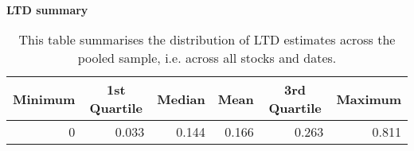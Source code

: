 \begin{table}[h]
\caption{\\ \large{\textbf{LTD summary}}}
\captionsetup{font = footnotesize, justification = justified, width = \linewidth}
\caption*{This table summarises the distribution of LTD estimates
                        across the pooled sample, i.e. across all stocks and dates.}
\centering
\label{tab:ltd_summary}
\begin{tabular}[t]{rrrrrr}
\toprule
\multicolumn{1}{c}{\textbf{Minimum}} & \multicolumn{1}{c}{\textbf{1st Quartile}} & \multicolumn{1}{c}{\textbf{Median}} & \multicolumn{1}{c}{\textbf{Mean}} & \multicolumn{1}{c}{\textbf{3rd Quartile}} & \multicolumn{1}{c}{\textbf{Maximum}}\\
\midrule
0 & 0.033 & 0.144 & 0.166 & 0.263 & 0.811\\
\bottomrule
\end{tabular}
\end{table}

